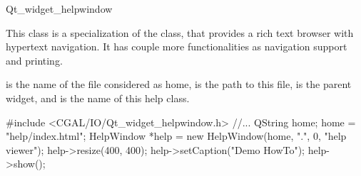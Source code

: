 
\begin{ccRefClass}{Qt_widget_helpwindow}

\ccDefinition
This class is a specialization of the  class, that
provides a rich text browser with hypertext navigation. It has couple
more functionalities as navigation support and printing.

\ccGlue

\ccInheritsFrom
{}

\ccCreation
{}
{ is the name of the file considered as home,  is 
the path to this file,  is the parent widget, and
 is the name of this help class.}




\ccExample
\begin{ccExampleCode}
  #include <CGAL/IO/Qt_widget_helpwindow.h>
  //...
  QString home;
  home = "help/index.html";
  HelpWindow *help = new HelpWindow(home, ".", 0, "help viewer");
  help->resize(400, 400);
  help->setCaption("Demo HowTo");
  help->show();
\end{ccExampleCode}

\end{ccRefClass}

